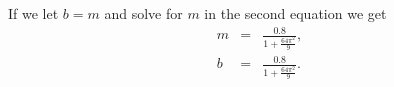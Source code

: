 \begin{frame}

  If we let $b=m$ and solve for $m$ in the second equation we get
  \begin{eqnarray*}
    m & = & \frac{0.8}{1 + \frac{64 \pi^2}{9}}, \\
    b & = & \frac{0.8}{1 + \frac{64 \pi^2}{9}}.  
  \end{eqnarray*}

\end{frame}


